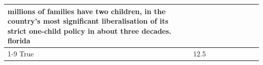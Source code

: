 \begin{table}[H]
\begin{tabular}{lllrlllll}
millions of families have two children, in the country's most significant liberalisation of its strict one-child policy in about three decades. florida \\
\cline{1-9}
True & 12.5%
\end{tabular}
\end{table}
